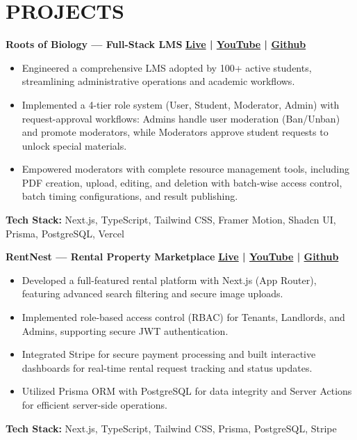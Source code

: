 \documentclass[a4paper,14pt]{extarticle}
\newcommand{\resumeItemListStart}{\begin{justify}\begin{itemize}[leftmargin=2.5ex, rightmargin=2ex, noitemsep,labelsep=1mm,itemsep=0.2mm]}
\newcommand{\resumeItemListEnd}{\end{itemize}\end{justify}\vspace{-2mm}}
\begin{document}
\section{PROJECTS}
\small
\textbf{Roots of Biology — Full-Stack LMS} \hfill \textbf{\href{https://rootsofbiology.vercel.app}{Live} | \href{https://youtu.be/dh-8Sf57l7c?si=uT_lJmYeFL4VbPag}{YouTube} | \href{https://github.com/tamjid97/Amader-Patshala-Fontand-v2.git}{Github}}
\resumeItemListStart
    \item Engineered a comprehensive LMS adopted by 100+ active students, streamlining administrative operations and academic workflows.
    \item Implemented a 4-tier role system (User, Student, Moderator, Admin) with request-approval workflows: Admins handle user moderation (Ban/Unban) and promote moderators, while Moderators approve student requests to unlock special materials.
    \item Empowered moderators with complete resource management tools, including PDF creation, upload, editing, and deletion with batch-wise access control, batch timing configurations, and result publishing.
\resumeItemListEnd
\textbf{Tech Stack:} Next.js, TypeScript, Tailwind CSS, Framer Motion, Shadcn UI, Prisma, PostgreSQL, Vercel
\vspace{2.5mm}

\textbf{RentNest — Rental Property Marketplace} \hfill \textbf{\href{https://rentnest-navy.vercel.app}{Live} | \href{https://youtu.be/_ZtuveLOK4A?si=nNtiLh5dmj15-x5A}{YouTube} | \href{https://github.com/tamjid97/RentNest_Frontend.git}{Github}}
\resumeItemListStart
    \item Developed a full-featured rental platform with Next.js (App Router), featuring advanced search filtering and secure image uploads.
    \item Implemented role-based access control (RBAC) for Tenants, Landlords, and Admins, supporting secure JWT authentication.
    \item Integrated Stripe for secure payment processing and built interactive dashboards for real-time rental request tracking and status updates.
    \item Utilized Prisma ORM with PostgreSQL for data integrity and Server Actions for efficient server-side operations.
\resumeItemListEnd
\textbf{Tech Stack:} Next.js, TypeScript, Tailwind CSS, Prisma, PostgreSQL, Stripe
\vspace{0.5mm}

\end{document}
